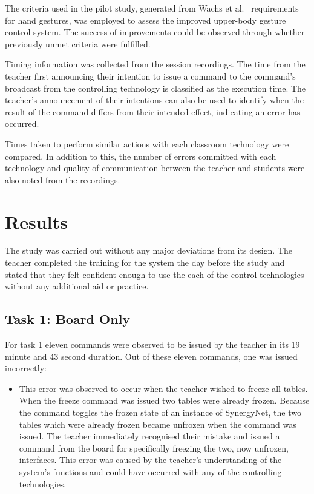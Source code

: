\documentclass[link]{IWCOMP}
\begin{document}


The criteria used in the pilot study, generated from Wachs et al.~\cite{Wachs2011} requirements for hand gestures, was employed to assess the improved upper-body gesture control system.
The success of improvements could be observed through whether previously unmet criteria were fulfilled.

Timing information was collected from the session recordings.
The time from the teacher first announcing their intention to issue a command to the command's broadcast from the controlling technology is classified as the execution time.
The teacher's announcement of their intentions can also be used to identify when the result of the command differs from their intended effect, indicating an error has occurred.

Times taken to perform similar actions with each classroom technology were compared.
In addition to this, the number of errors committed with each technology and quality of communication between the teacher and students were also noted from the recordings.

\section{Results}
\label{sec:results}


The study was carried out without any major deviations from its design.
The teacher completed the training for the system the day before the study and stated that they felt confident enough to use the each of the control technologies without any additional aid or practice.

\subsection{Task 1: Board Only}
\label{subsec:resultsTask1}

For task 1 eleven commands were observed to be issued by the teacher in its 19 minute and 43 second duration.
Out of these eleven commands, one was issued incorrectly:

\begin{itemize}
\item This error was observed to occur when the teacher wished to freeze all tables.
When the freeze command was issued two tables were already frozen.
Because the command toggles the frozen state of an instance of SynergyNet, the two tables which were already frozen became unfrozen when the command was issued.
The teacher immediately recognised their mistake and issued a command from the board for specifically freezing the two, now unfrozen, interfaces.
This error was caused by the teacher's understanding of the system's functions and could have occurred with any of the controlling technologies.
\end{itemize}
\end{document}
